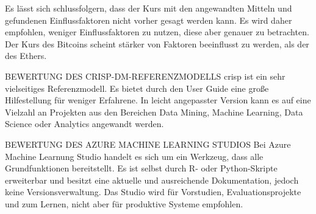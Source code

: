 Es lässt sich schlussfolgern, dass der Kurs mit den angewandten Mitteln und gefundenen Einflussfaktoren nicht vorher gesagt werden kann. Es wird daher empfohlen, weniger Einflussfaktoren zu nutzen, diese aber genauer zu betrachten. Der Kurs des Bitcoins scheint stärker von Faktoren beeinflusst zu werden, als der des Ethers.

{\normalsize BEWERTUNG DES CRISP-DM-REFERENZMODELLS} \newline
\gls{crisp} ist ein sehr vielseitiges Referenzmodell. Es bietet durch den User Guide eine große Hilfestellung für weniger Erfahrene. In leicht angepasster Version kann es auf eine Vielzahl an Projekten aus den Bereichen Data Mining, Machine Learning, Data Science oder Analytics angewandt werden.

{\normalsize BEWERTUNG DES AZURE MACHINE LEARNING STUDIOS} \newline
Bei Azure Machine Learnung Studio handelt es sich um ein Werkzeug, dass alle Grundfunktionen bereitstellt. Es ist selbst durch R- oder Python-Skripte erweiterbar und besitzt eine aktuelle und ausreichende Dokumentation, jedoch keine Versionsverwaltung. Das Studio wird für Vorstudien, Evaluationsprojekte und zum Lernen, nicht aber für produktive Systeme empfohlen.
